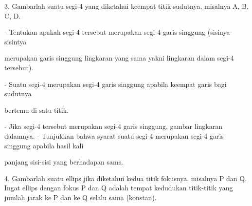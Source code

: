\documentclass{article}
\begin{document}
\begin{eulernotebook}
\begin{eulercomment}
\begin{eulercomment}
\begin{eulercomment}
\begin{eulercomment}
\begin{eulercomment}
3. Gambarlah suatu segi-4 yang diketahui keempat titik sudutnya, misalnya A, B, C, D.\\
\end{eulercomment}
\begin{eulerttcomment}
   - Tentukan apakah segi-4 tersebut merupakan segi-4 garis singgung (sisinya-sisintya
\end{eulerttcomment}
\begin{eulercomment}
merupakan garis singgung lingkaran yang sama yakni lingkaran dalam segi-4 tersebut).\\
\end{eulercomment}
\begin{eulerttcomment}
   - Suatu segi-4 merupakan segi-4 garis singgung apabila keempat garis bagi sudutnya
\end{eulerttcomment}
\begin{eulercomment}
bertemu di satu titik.\\
\end{eulercomment}
\begin{eulerttcomment}
   - Jika segi-4 tersebut merupakan segi-4 garis singgung, gambar lingkaran dalamnya.
   - Tunjukkan bahwa syarat suatu segi-4 merupakan segi-4 garis singgung apabila hasil kali
\end{eulerttcomment}
\begin{eulercomment}
panjang sisi-sisi yang berhadapan sama.

4. Gambarlah suatu ellips jika diketahui kedua titik fokusnya, misalnya P dan Q. Ingat
ellips dengan fokus P dan Q adalah tempat kedudukan titik-titik yang jumlah jarak ke P dan
ke Q selalu sama (konstan).


\end{eulercomment}
\end{eulercomment}
\end{eulercomment}
\end{eulercomment}
\end{eulercomment}
\end{eulernotebook}
\end{document}
